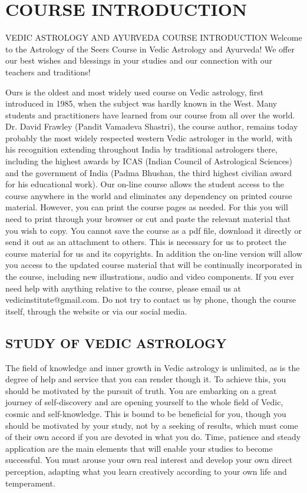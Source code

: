 \section{COURSE INTRODUCTION}

 
VEDIC ASTROLOGY AND AYURVEDA COURSE INTRODUCTION
  Welcome to the Astrology of the Seers Course in Vedic Astrology and Ayurveda! We offer our best wishes and blessings in your studies and our connection with our teachers and traditions!  

Ours is the oldest and most widely used course on Vedic astrology, first introduced in 1985, when the subject was hardly known in the West. Many students and practitioners have learned from our course from all over the world.
Dr. David Frawley (Pandit Vamadeva Shastri), the course author, remains today probably the most widely respected western Vedic astrologer in the world, with his recognition extending throughout India by traditional astrologers there, including the highest awards by ICAS (Indian Council of Astrological Sciences) and the government of India (Padma Bhushan, the third highest civilian award for his educational work).
Our on-line course allows the student access to the course anywhere in the world and eliminates any dependency on printed course material. However, you can print the course pages as needed. For this you will need to print through your browser or cut and paste the relevant material that you wish to copy. You cannot save the course as a pdf file, download it directly or send it out as an attachment to others. This is necessary for us to protect the course material for us and its copyrights.
In addition the on-line version will allow you access to the updated course material that will be continually incorporated in the course, including new illustrations, audio and video components.
  If you ever need help with anything relative to the course, please email  us at vedicinstitute@gmail.com. Do not try to contact us by phone, though the course itself, through the website or via our social media.

\subsection{STUDY OF VEDIC ASTROLOGY}
     The field of knowledge and inner growth in Vedic astrology is unlimited, as is the degree of help and service that you can render though it. To achieve this, you should be motivated by the pursuit of truth. You are embarking on a great journey of self-discovery and are opening yourself to the whole field of Vedic, cosmic and self-knowledge. This is bound to be beneficial for you, though you should be motivated by your study, not by a seeking of results, which must come of their own accord if you are devoted in what you do.   Time, patience and steady application are the main elements that will enable your studies to become successful. You must arouse your own real interest and develop your own direct perception, adapting what you learn creatively according to your own life and temperament.  

